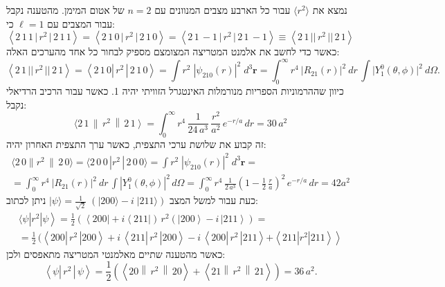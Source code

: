 \documentclass{tstextbook}
\begin{document}
\begin{example}
נמצא את \(\langle r^{2} \rangle\) עבור כל הארבע מצבים המנוונים עם \(n=2\) של אטום המימן. מהטענה נקבל עבור המצבים עם \(\ell=1\) כי:
$$\left\langle2\,1\,1\,{|}\,r^{2}\,{|}\,2\,1\,1\right\rangle=\left\langle2\,1\,0\,{|}\,r^{2}\,{|}\,2\,1\,0\right\rangle=\left\langle2\,1\,-1\,{|}\,r^{2}\,{|}\,2\,1\,-1\right\rangle\equiv\left\langle2\,1\,{\big|\big|}\,r^{2}\,{\big|\big|}\,2\,1\right\rangle$$
כאשר כדי לחשב את אלמנט המטריצה המצומצם מספיק לבחור כל אחד מהערכים האלה:
$$\left\langle2\,1\,{\big|\big|}\,r^{2}\,{\big|\big|}\,2\,1\right\rangle=\left\langle2\,1\,0\left|\,r^{2}\,\right|\,2\,1\,0\right\rangle=\int r^{2}\;|\psi_{210}(r)|^{2}\;d^{3}\mathbf{r}=\int_{0}^{\infty}r^{4}~|R_{21}(r)|^{2}~d r\,\int\Big|Y_{1}^{0}(\theta,\phi)\Big|^{2}~d\Omega.$$
כיוון שההרמוניות הספריות מנורמלות האינטגרל הזוויתי יהיה 1. כאשר עבור הרכיב הרדיאלי נקבל:
$$\langle2\,1\,\|\,r^{2}\,\left\|\,2\,1\right\rangle=\int_{0}^{\infty}r^{4}\,\frac{1}{24\,a^{3}}\,\frac{r^{2}}{a^{2}}\,e^{-r/a}\,d r=30\,a^{2}$$
זה קבוע את שלושת ערכי התצפית, כאשר ערך התצפית האחרון יהיה:
$$\begin{gather}\langle 2\,0\|r^{2}\,\|\,2\,0 \rangle=\langle 2\,0\,0\,|r^{2}\,|\,2\,0\,0 \rangle=\int r^{2}\;|\psi_{210}(r)|^{2}\;d^{3}\mathbf{r}=\\=\int_{0}^{\infty}r^{4}~|R_{21}(r)|^{2}~d r\,\int\left|Y_{1}^{0}(\theta,\phi)\right|^{2}\,d\Omega= \int_{0}^{\infty}r^{4}\,{\frac{1}{2\,a^{3}}}\left(1-{\frac{1}{2}}\,{\frac{r}{a}}\right)^{2}\,e^{-r/a}\,d r= 42a^{2}
\end{gather}$$
כעת עבור למשל המצב \(|\psi\rangle={\frac{1}{\sqrt{2}}}\;(|200\rangle-i\;|211\rangle)\) ניתן לכתוב:
$$\begin{gather}\langle\psi\left|\left.r^{2}\right|\psi\right\rangle=\frac{1}{2}\left(\left\langle200\right|+i\left\langle211\right|\right)\,r^{2}\left(\left|200\right\rangle-i\,\left|211\right\rangle\right)= \\={\frac{1}{2}}\,(\left\langle200\left|\,r^{2}\,\right|200\right\rangle+i\,\left\langle211\left|\,r^{2}\,\right|200\right\rangle-i\,\left\langle200\left|\,r^{2}\,\right|211\right\rangle\left.+\left\langle211\left|\left.r^{2}\right|211\right\rangle\right\rangle\right.
\end{gather}$$
כאשר מהטענה שתיים מאלמנטי המטריצה מתאפסים ולכן:
$$\left\langle\psi\left|\,r^{2}\,\right|\,\psi\right\rangle=\frac{1}{2}\left(\left\langle20\left\|\,r^{2}\,\right\|\,20\right\rangle+\left\langle21\left\|\,r^{2}\,\right\|\,21\right\rangle\right)=36\,a^{2}.$$

\end{example}
\end{document}
